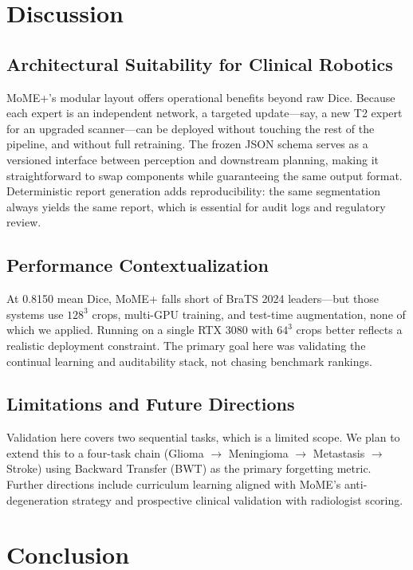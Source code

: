\documentclass[conference]{IEEEtran}
\begin{document}
\section{Discussion}

\subsection{Architectural Suitability for Clinical Robotics}
MoME+'s modular layout offers operational benefits beyond raw Dice. Because each expert is an independent network, a targeted update---say, a new T2 expert for an upgraded scanner---can be deployed without touching the rest of the pipeline, and without full retraining. The frozen JSON schema serves as a versioned interface between perception and downstream planning, making it straightforward to swap components while guaranteeing the same output format. Deterministic report generation adds reproducibility: the same segmentation always yields the same report, which is essential for audit logs and regulatory review.

\subsection{Performance Contextualization}
At 0.8150 mean Dice, MoME+ falls short of BraTS 2024 leaders---but those systems use $128^3$ crops, multi-GPU training, and test-time augmentation, none of which we applied. Running on a single RTX 3080 with $64^3$ crops better reflects a realistic deployment constraint. The primary goal here was validating the continual learning and auditability stack, not chasing benchmark rankings.

\subsection{Limitations and Future Directions}
Validation here covers two sequential tasks, which is a limited scope. We plan to extend this to a four-task chain (Glioma $\rightarrow$ Meningioma $\rightarrow$ Metastasis $\rightarrow$ Stroke) using Backward Transfer (BWT) as the primary forgetting metric. Further directions include curriculum learning aligned with MoME's anti-degeneration strategy \cite{zhang2024mome} and prospective clinical validation with radiologist scoring.

\section{Conclusion}
\end{document}
